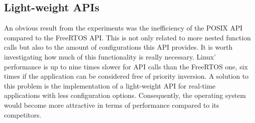 \subsection{Light-weight APIs}
An obvious result from the experiments was the inefficiency of the POSIX \ac{API} compared to the FreeRTOS \ac{API}.
This is not only related to more nested function calls but also to the amount of configurations this \ac{API} provides.
It is worth investigating how much of this functionality is really necessary.
Linux' performance is up to nine times slower for \ac{API} calls than the FreeRTOS one, six times if the application can be considered free of priority inversion.
A solution to this problem is the implementation of a light-weight \ac{API} for real-time applications with less configuration options.
Consequently, the operating system would become more attractive in terms of performance compared to its competitors.